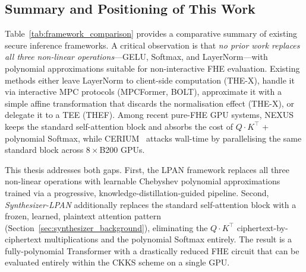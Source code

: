 \subsection{Summary and Positioning of This Work}

Table~\ref{tab:framework_comparison} provides a comparative summary of existing secure inference frameworks. A critical observation is that \emph{no prior work replaces all three non-linear operations}---GELU, Softmax, and LayerNorm---with polynomial approximations suitable for non-interactive FHE evaluation. Existing methods either leave LayerNorm to client-side computation (THE-X), handle it via interactive MPC protocols (MPCFormer, BOLT), approximate it with a simple affine transformation that discards the normalisation effect (THE-X), or delegate it to a TEE (THEF). Among recent pure-FHE GPU systems, NEXUS~\cite{zhang2024nexus} keeps the standard self-attention block and absorbs the cost of $Q\!\cdot\!K^\top$ + polynomial Softmax, while CERIUM~\cite{cerium2025} attacks wall-time by parallelising the same standard block across $8\times$B200 GPUs.

This thesis addresses both gaps. First, the LPAN framework replaces all three non-linear operations with learnable Chebyshev polynomial approximations trained via a progressive, knowledge-distillation-guided pipeline. Second, \emph{Synthesizer-LPAN} additionally replaces the standard self-attention block with a frozen, learned, plaintext attention pattern (Section~\ref{sec:synthesizer_background}), eliminating the $Q\!\cdot\!K^\top$ ciphertext-by-ciphertext multiplications and the polynomial Softmax entirely. The result is a fully-polynomial Transformer with a drastically reduced FHE circuit that can be evaluated entirely within the CKKS scheme on a single GPU.

